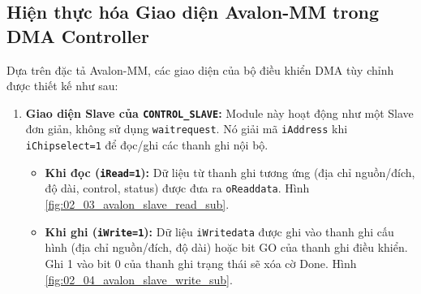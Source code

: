 \subsection{Hiện thực hóa Giao diện Avalon-MM trong DMA Controller}
Dựa trên đặc tả Avalon-MM, các giao diện của bộ điều khiển DMA tùy chỉnh được thiết kế như sau:
\begin{enumerate}
    \item \textbf{Giao diện Slave của \texttt{CONTROL\_SLAVE}:} Module này hoạt động như một Slave đơn giản, không sử dụng \texttt{waitrequest}. Nó giải mã \texttt{iAddress} khi \texttt{iChipselect=1} để đọc/ghi các thanh ghi nội bộ.
        \begin{itemize}
            \item \textbf{Khi đọc (\texttt{iRead=1}):} Dữ liệu từ thanh ghi tương ứng (địa chỉ nguồn/đích, độ dài, control, status) được đưa ra \texttt{oReaddata}. Hình \ref{fig:02_03_avalon_slave_read_sub}.
            \item \textbf{Khi ghi (\texttt{iWrite=1}):} Dữ liệu \texttt{iWritedata} được ghi vào thanh ghi cấu hình (địa chỉ nguồn/đích, độ dài) hoặc bit GO của thanh ghi điều khiển. Ghi 1 vào bit 0 của thanh ghi trạng thái sẽ xóa cờ Done. Hình \ref{fig:02_04_avalon_slave_write_sub}.
        \end{itemize}


\end{enumerate}
